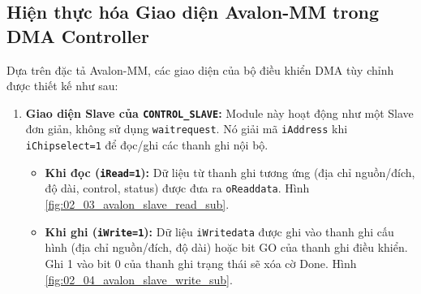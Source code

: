 \subsection{Hiện thực hóa Giao diện Avalon-MM trong DMA Controller}
Dựa trên đặc tả Avalon-MM, các giao diện của bộ điều khiển DMA tùy chỉnh được thiết kế như sau:
\begin{enumerate}
    \item \textbf{Giao diện Slave của \texttt{CONTROL\_SLAVE}:} Module này hoạt động như một Slave đơn giản, không sử dụng \texttt{waitrequest}. Nó giải mã \texttt{iAddress} khi \texttt{iChipselect=1} để đọc/ghi các thanh ghi nội bộ.
        \begin{itemize}
            \item \textbf{Khi đọc (\texttt{iRead=1}):} Dữ liệu từ thanh ghi tương ứng (địa chỉ nguồn/đích, độ dài, control, status) được đưa ra \texttt{oReaddata}. Hình \ref{fig:02_03_avalon_slave_read_sub}.
            \item \textbf{Khi ghi (\texttt{iWrite=1}):} Dữ liệu \texttt{iWritedata} được ghi vào thanh ghi cấu hình (địa chỉ nguồn/đích, độ dài) hoặc bit GO của thanh ghi điều khiển. Ghi 1 vào bit 0 của thanh ghi trạng thái sẽ xóa cờ Done. Hình \ref{fig:02_04_avalon_slave_write_sub}.
        \end{itemize}


\end{enumerate}
